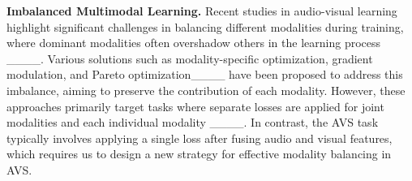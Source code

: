 \vspace{2mm}
\noindent
\textbf{Imbalanced Multimodal Learning.}
Recent studies in audio-visual learning highlight significant challenges in balancing different modalities during training, where dominant modalities often overshadow others in the learning process ____. Various solutions such as modality-specific optimization, gradient modulation, and Pareto optimization____ have been proposed to address this imbalance, aiming to preserve the contribution of each modality. However, these approaches primarily target tasks where separate losses are applied for joint modalities and each individual modality ____. In contrast, the AVS task typically involves applying a single loss after fusing audio and visual features, which requires us to design a new strategy for effective modality balancing in AVS.